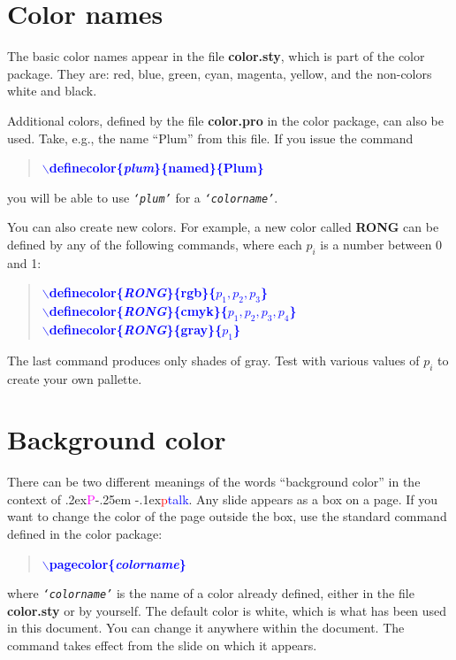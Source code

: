 \documentclass[12pt]{article}
\def\pptalk{{
\raise.2ex\hbox{\textcolor{magenta}P}\kern-.25em
\raise-.1ex\hbox{\textcolor{red}p}\textcolor{blue}{talk}}}
\def\ecomm#1{{\textcolor{blue}{$\backslash${\bf #1}}}}
\def\file#1{\textcolor{darkpurple}{\bf #1}}
\def\txtem#1{\texttt{\sl `#1'}}
\begin{document}
\endslide


\beginslide

\section{Color names}
The basic color names appear in the file \file{color.sty}, which is
part of the color package.  They are: red, blue, green, cyan, magenta,
yellow, and the non-colors white and black.

\newsegment

Additional colors, defined by the file \file{color.pro} in the color
package, can also be used.  Take, e.g., the name ``Plum'' from this
file.  If you issue the command
%
\begin{quote}
\ecomm{definecolor\{{\em plum}\}\{named\}\{Plum\}} 
\end{quote}
%
you will be able to use \txtem{plum} for a \txtem{colorname}.

\newsegment

You can also create new colors.  For example, a new color called {\bf
RONG} can be defined by any of the following commands, where each
$p_i$ is a number between 0 and 1:
%
\begin{quote}%
\ecomm{definecolor\{{\em RONG}\}\{rgb\}\{$p_1,p_2,p_3$\}} \\
\ecomm{definecolor\{{\em RONG}\}\{cmyk\}\{$p_1,p_2,p_3,p_4$\}} \\
\ecomm{definecolor\{{\em RONG}\}\{gray\}\{$p_1$\}}
\end{quote}
%
The last command produces only shades of gray.  Test with various
values of $p_i$ to create your own pallette.


\endslide

\beginslide 

\section{Background color} 
There can be two different meanings of the words ``background color''
in the context of \pptalk.  Any slide appears as a box on a page.  If
you want to change the color of the page outside the box, use the
standard command defined in the color package:
\begin{quote}
\ecomm{pagecolor\{{\em colorname}\}}
\end{quote}
%
where \txtem{colorname} is the name of a color already defined,
either in the file \file{color.sty} or by yourself.  The default color
is white, which is what has been used in this document.  You can
change it anywhere within the document.  The command takes effect from
the slide on which it appears.
\end{document}
